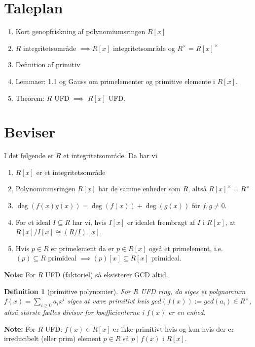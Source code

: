 \documentclass[10pt,twoside,openany,final]{memoir}
\theoremstyle{break}
\newtheorem{definition}[section]{Definition}
\theoremstyle{Break}
\begin{document}
\section*{Taleplan}
\begin{enumerate}
\item Kort genopfriskning af polynomiumsringen $R[x]$
\item $R$ integritetsområde $\implies R[x]$ integritetsområde og $R^{\times}=R[x]^{\times}$
\item Definition af primitiv
\item Lemmaer: 1.1 og Gauss om primelementer og primitive elemente i $R[x]$.
\item Theorem: $R$ UFD $\implies$ $R[x]$ UFD.
\end{enumerate}
\section*{Beviser}
I det følgende er $R$ et integritetsområde. Da har vi
\begin{enumerate}
\item $R[x]$ er et integritetsområde
\item Polynomiumsringen $R[x]$ har de samme enheder som $R$, altså $R[x]^{\times}=R^\times$
\item $\deg(f(x)g(x))=\deg(f(x))+\deg(g(x))$ for $f,g\neq 0$.
\item For et ideal $I \subseteq R$ har vi, hvis $I[x]$ er idealet frembragt af $I$ i $R[x]$, at $R[x]/I[x] \cong (R/I)[x]$.
\item Hvis $p \in R$ er primelement da er $p \in R[x]$ også et primelement, i.e. $(p)\subseteq R$ primideal $\implies (p)[x] \subseteq R[x]$ primideal.
\end{enumerate}
\textbf{Note:} For $R$ UFD (faktoriel) så eksisterer GCD altid.

\begin{definition}[primitive polynomier]
For $R$ UFD ring, da siges et polynomium $f(x) = \sum_{i\geq 0} a_i x^i$ siges at være \emph{primitivt} hvis $gcd(f(x)):=gcd(a_i) \in R^\times$, altså største fælles divisor for koefficienterne i  $f(x)$ er en enhed.
\end{definition}
\noindent \textbf{Note:} For $R$ UFD: $f(x) \in R[x]$ er ikke-primitivt hvis og kun hvis der er irreducibelt (eller prim) element $p \in R$ så $p \mid f(x)$ i $R[x]$.
\end{document}
